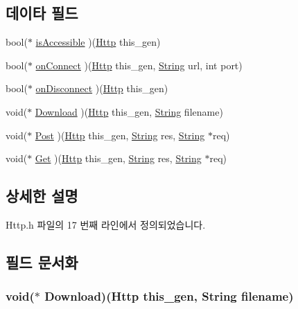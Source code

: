 \subsection*{데이타 필드}
\begin{DoxyCompactItemize}
\item 
bool($\ast$ \hyperlink{struct___http_a3f21ba58588b0d2e11e7611caf3fa65c}{is\-Accessible} )(\hyperlink{_http_8h_ab22f08c745d656245f8d98e3d095c584}{Http} this\-\_\-gen)
\item 
bool($\ast$ \hyperlink{struct___http_a952cc07a3505431bf33a7a6393a1503a}{on\-Connect} )(\hyperlink{_http_8h_ab22f08c745d656245f8d98e3d095c584}{Http} this\-\_\-gen, \hyperlink{dit_8h_a2efe6d463d80744789f228f5dc4baa39}{String} url, int port)
\item 
bool($\ast$ \hyperlink{struct___http_ad6d1f6047ef195fe434e3d259aa0375a}{on\-Disconnect} )(\hyperlink{_http_8h_ab22f08c745d656245f8d98e3d095c584}{Http} this\-\_\-gen)
\item 
void($\ast$ \hyperlink{struct___http_a5c2263401d4e2ad7e91fa5189b2a60e1}{Download} )(\hyperlink{_http_8h_ab22f08c745d656245f8d98e3d095c584}{Http} this\-\_\-gen, \hyperlink{dit_8h_a2efe6d463d80744789f228f5dc4baa39}{String} filename)
\item 
void($\ast$ \hyperlink{struct___http_a451c690a3b05c1c9ee2af0cc6903b9d7}{Post} )(\hyperlink{_http_8h_ab22f08c745d656245f8d98e3d095c584}{Http} this\-\_\-gen, \hyperlink{dit_8h_a2efe6d463d80744789f228f5dc4baa39}{String} res, \hyperlink{dit_8h_a2efe6d463d80744789f228f5dc4baa39}{String} $\ast$req)
\item 
void($\ast$ \hyperlink{struct___http_a7d476aeddf2c20ee482845959c71446b}{Get} )(\hyperlink{_http_8h_ab22f08c745d656245f8d98e3d095c584}{Http} this\-\_\-gen, \hyperlink{dit_8h_a2efe6d463d80744789f228f5dc4baa39}{String} res, \hyperlink{dit_8h_a2efe6d463d80744789f228f5dc4baa39}{String} $\ast$req)
\end{DoxyCompactItemize}


\subsection{상세한 설명}


Http.\-h 파일의 17 번째 라인에서 정의되었습니다.



\subsection{필드 문서화}
\hypertarget{struct___http_a5c2263401d4e2ad7e91fa5189b2a60e1}{
\subsubsection[{Download}]{\setlength{\rightskip}{0pt plus 5cm}void($\ast$  Download)({\bf Http} this\-\_\-gen, {\bf String} filename)}}\label{struct___http_a5c2263401d4e2ad7e91fa5189b2a60e1}


